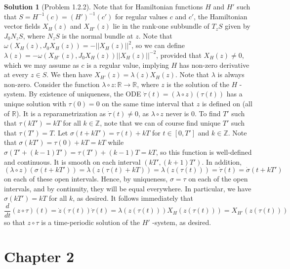\documentclass[aps,pra,showpacs,notitlepage,onecolumn,superscriptaddress,nofootinbib]{revtex4-1}
\theoremstyle{definition}
\newtheorem{solution}{Solution}[section]
\begin{document}
\begin{solution}[Problem 1.2.2]
  Note that for Hamiltonian functions $H$ and $H'$ such that $S = H^{-1}(c) = (H')^{-1}(c')$ for regular values $c$ and $c'$, the Hamiltonian vector fields $X_H(z)$ and $X_{H'}(z)$
lie in the rank-one subbundle of $T_z S$ given by $J_0 N_z S$, where $N_z S$ is the normal bundle at $z$. Note that $\omega(X_H(z), J_0 X_H(z)) = -||X_H(z)||^2$, so we can define
$\lambda(z) = -\omega(X_{H'}(z), J_0 X_H(z)) ||X_H(z)||^{-2}$, provided that $X_H(z) \neq 0$, which we may assume as $c$ is a regular value, implying $H$ has non-zero derivative at every $z \in S$.
We then have $X_{H'}(z) = \lambda(z) X_H(z)$. Note that $\lambda$ is always non-zero. Consider the function $\lambda \circ z : \mathbb{R} \rightarrow \mathbb{R}$, where $z$ is the solution of the $H$ -system. By existence of uniqueness, the ODE $\dot{\tau}(t) = (\lambda \circ z)(\tau(t))$
has a unique solution with $\tau(0) = 0$ on the same time interval that $z$ is defined on (all of $\mathbb{R}$). It is a reparametrization as $\dot{\tau}(t) \neq 0$, as $\lambda \circ z$ never is $0$. To find $T'$ such that $\tau(kT') = kT$ for all $k \in \mathbb{Z}$, note that we can of course find unique $T'$ such that $\tau(T') = T$. Let $\sigma(t + k T') = \tau(t) + k T$
for $t \in [0, T']$ and $k \in \mathbb{Z}$. Note that $\sigma(kT') = \tau(0) + k T = kT$ while $\sigma(T' + (k - 1) T') = \tau(T') + (k - 1) T = kT$, so this function is well-defined
and continuous. It is smooth on each interval $(kT', (k + 1) T')$. In addition,
\begin{equation}
(\lambda \circ z)(\sigma(t + kT')) = \lambda(z(\tau(t) + kT)) = \lambda(z(\tau(t))) = \dot{\tau}(t) = \dot{\sigma}(t + k T')
\end{equation}
on each of these open intervals. Hence, by uniqueness, $\sigma = \tau$ on each of the open intervals, and by continuity, they will be equal everywhere. In particular, we have $\sigma(kT') = kT$
for all $k$, as desired. It follows immediately that
\begin{equation}
\frac{d}{dt} (z \circ \tau)(t) = \dot{z}(\tau(t)) \dot{\tau}(t) = \lambda(z(\tau(t))) X_H(z(\tau(t))) = X_{H'}(z(\tau(t)))
\end{equation}
so that $z \circ \tau$ is a time-periodic solution of the $H'$ -system, as desired.
  \end{solution}

\section{Chapter 2}
\end{document}
